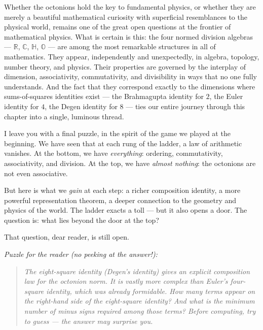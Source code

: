 Whether the octonions hold the key to fundamental physics, or whether they are merely a beautiful mathematical curiosity with superficial resemblances to the physical world, remains one of the great open questions at the frontier of mathematical physics. What is certain is this: the four normed division algebras --- $\mathbb{R}$, $\mathbb{C}$, $\mathbb{H}$, $\mathbb{O}$ --- are among the most remarkable structures in all of mathematics. They appear, independently and unexpectedly, in algebra, topology, number theory, and physics. Their properties are governed by the interplay of dimension, associativity, commutativity, and divisibility in ways that no one fully understands. And the fact that they correspond exactly to the dimensions where sums-of-squares identities exist --- the Brahmagupta identity for $2$, the Euler identity for $4$, the Degen identity for $8$ --- ties our entire journey through this chapter into a single, luminous thread.

I leave you with a final puzzle, in the spirit of the game we played at the beginning. We have seen that at each rung of the ladder, a law of arithmetic vanishes. At the bottom, we have \textit{everything}: ordering, commutativity, associativity, and division. At the top, we have \textit{almost nothing}: the octonions are not even associative.

But here is what we \textit{gain} at each step: a richer composition identity, a more powerful representation theorem, a deeper connection to the geometry and physics of the world. The ladder exacts a toll --- but it also opens a door. The question is: what lies beyond the door at the top?

That question, dear reader, is still open.


\bigskip


\textit{Puzzle for the reader (no peeking at the answer!):}

\begin{quote}
\itshape \textit{The eight-square identity (Degen's identity) gives an explicit composition law for the octonion norm. It is vastly more complex than Euler's four-square identity, which was already formidable. How many terms appear on the right-hand side of the eight-square identity? And what is the minimum number of minus signs required among those terms? Before computing, try to guess --- the answer may surprise you.}
\end{quote}

